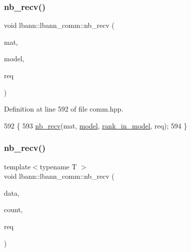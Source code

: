 \subsubsection{\texorpdfstring{nb\+\_\+recv()}{nb\_recv()}\hspace{0.1cm}{\footnotesize\ttfamily [6/9]}}
{\footnotesize\ttfamily void lbann\+::lbann\+\_\+comm\+::nb\+\_\+recv (\begin{DoxyParamCaption}\item[{\hyperlink{base_8hpp_a0fab5387556805cfeac3e7e567bf66c5}{Dist\+Mat} \&}]{mat,  }\item[{int}]{model,  }\item[{El\+::mpi\+::\+Request$<$ Data\+Type $>$ \&}]{req }\end{DoxyParamCaption})\hspace{0.3cm}{\ttfamily [inline]}}



Definition at line 592 of file comm.\+hpp.


\begin{DoxyCode}
592                                                                      \{
593     \hyperlink{classlbann_1_1lbann__comm_aac24e8802602c73efddb455274e158f4}{nb\_recv}(mat, \hyperlink{namespacelbann_adee41f31f15f3906cbdcce4a1417eb56a20f35e630daf44dbfa4c3f68f5399d8c}{model}, \hyperlink{classlbann_1_1lbann__comm_a0dcccd57c2b591eb7682e192e0a09033}{rank\_in\_model}, req);
594   \}
\end{DoxyCode}
\mbox{\label{classlbann_1_1lbann__comm_a77c74bcc60e9946d45cf575234a7acc2}} 
\subsubsection{\texorpdfstring{nb\+\_\+recv()}{nb\_recv()}\hspace{0.1cm}{\footnotesize\ttfamily [7/9]}}
{\footnotesize\ttfamily template$<$typename T $>$ \\
void lbann\+::lbann\+\_\+comm\+::nb\+\_\+recv (\begin{DoxyParamCaption}\item[{T $\ast$}]{data,  }\item[{int}]{count,  }\item[{El\+::mpi\+::\+Request$<$ T $>$ \&}]{req }\end{DoxyParamCaption})\hspace{0.3cm}{\ttfamily [inline]}}



